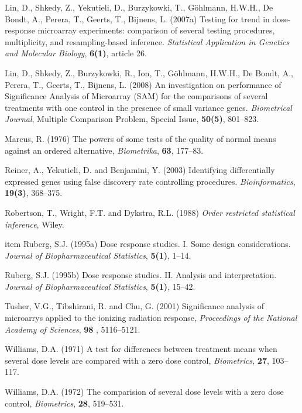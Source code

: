 \begin{list}{}{\setlength{\leftmargin}{.3in}\setlength{\itemindent}{-.2in}}
\item Lin, D., Shkedy, Z., Yekutieli, D., Burzykowki,
T., G\"{o}hlmann, H.W.H., De Bondt, A., Perera, T., Geerts, T.,
Bijnens, L. (2007a) Testing for trend in dose-response microarray
experiments: comparison of several testing procedures, multiplicity,
and resampling-based inference. \textit{Statistical Application in
Genetics and Molecular Biology}, \textbf{6(1)}, article 26.%

\item Lin, D., Shkedy, Z., Burzykowki, R., Ion,
T., G\"{o}hlmann, H.W.H., De Bondt, A., Perera, T., Geerts, T.,
Bijnens, L. (2008) An investigation on performance of Significance
Analysis of Microarray (SAM) for the comparisons of several
treatments with one control in the presence of small variance genes.
\textit{Biometrical Journal}, Multiple Comparison Problem, Special Issue,
\textbf{50(5)}, 801--823.%



\item Marcus, R. (1976) The powers of some tests of
the quality of normal means against an ordered alternative,
\textit{Biometrika}, \textbf{63}, 177--83.%

\item Reiner, A., Yekutieli, D. and
Benjamini, Y. (2003) Identifying differentially expressed genes
using false discovery rate controlling procedures.
\textit{Bioinformatics}, \textbf{19(3)}, 368--375.%

\item Robertson, T., Wright, F.T. and Dykstra, R.L. (1988) \textit{ Order restricted statistical inference}, Wiley.%



item Ruberg, S.J. (1995a) Dose response studies. I. Some design
considerations. \textit{Journal of Biopharmaceutical Statistics},
\textbf{5(1)}, 1--14.%

\item Ruberg, S.J. (1995b) Dose response studies. II. Analysis and
interpretation. \textit{Journal of Biopharmaceutical Statistics},
\textbf{5(1)}, 15--42.%

\item Tusher, V.G., Tibshirani, R. and
Chu, G. (2001) Significance analysis of microarrys applied to the
ionizing radiation response, \textit{Proceedings of the National
Academy of Sciences}, \textbf{98} , 5116--5121.%


\item Williams, D.A. (1971) A test for differences between treatment
means when several dose levels are compared with a zero dose
control, \textit{Biometrics}, \textbf{27}, 103--117.%

\item Williams, D.A. (1972) The comparision of several dose levels
with a zero dose control, \textit{Biometrics}, \textbf{28},
519--531.%


\end{list}




